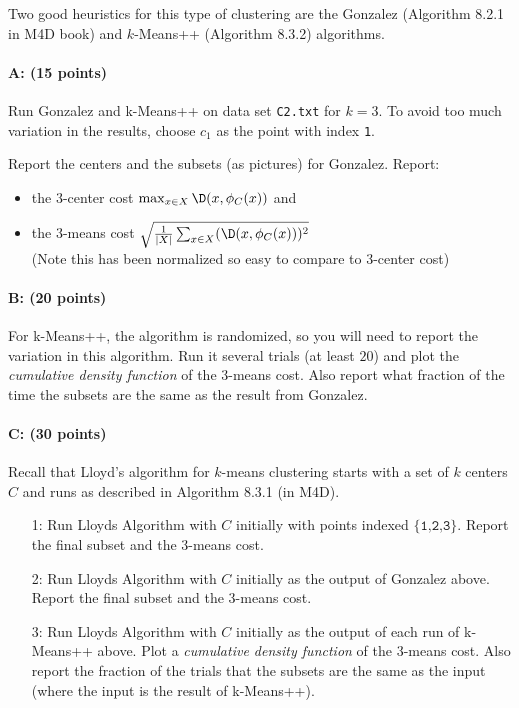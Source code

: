 \documentclass[11pt]{article}
\begin{document}
Two good heuristics for this type of clustering are the 
\textsf{Gonzalez} (Algorithm 8.2.1 in M4D book) and \textsf{$k$-Means++} (Algorithm 8.3.2) algorithms.  

\paragraph{A: (15 points)}
Run \textsf{Gonzalez} and \textsf{k-Means++} on data set \texttt{C2.txt} for $k=3$. 
To avoid too much variation in the results, choose $c_1$ as the point with index \texttt{1}.  

Report the centers and the subsets (as pictures) for \textsf{Gonzalez}.  Report:
\begin{itemize} \denselist
\item the $3$-center cost $\max_{x \in X} \D(x,\phi_C(x))$  and 
\item the $3$-means cost $\sqrt{\frac{1}{|X|}\sum_{x \in X} (\D(x,\phi_C(x)))^2}$
  \\ (Note this has been normalized so easy to compare to $3$-center cost)
\end{itemize}


\paragraph{B: (20 points)}
For \textsf{k-Means++}, the algorithm is randomized, so you will need to report the variation in this algorithm.  Run it several trials (at least $20$) and plot the \emph{cumulative density function} of the $3$-means cost.  
Also report what fraction of the time the subsets are the same as the result from \textsf{Gonzalez}.  


\paragraph{C: (30 points)}
Recall that Lloyd's algorithm for $k$-means clustering starts with a set of $k$ centers $C$ and runs as described in Algorithm 8.3.1 (in M4D).  

\begin{itemize}
\item[1:]  Run Lloyds Algorithm with $C$ initially with points indexed $\{\texttt{1,2,3}\}$.  Report the final subset and the $3$-means cost.  
\item[2:]  Run Lloyds Algorithm with $C$ initially as the output of \textsf{Gonzalez} above.  Report the final subset and the $3$-means cost.  
\item[3:]  Run Lloyds Algorithm with $C$ initially as the output of each run of \textsf{k-Means++} above.  Plot a \emph{cumulative density function} of the $3$-means cost.  Also report the fraction of the trials that the subsets are the same as the input (where the input is the result of \textsf{k-Means++}).  
\end{itemize}
\end{document}
